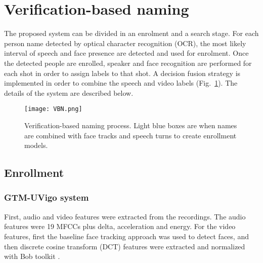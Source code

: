 \section{Verification-based naming}
\label{sec:verification}


The proposed system can be divided in an enrolment and a search stage. For each person name detected by optical character recognition (OCR), the most likely interval
of speech and face presence are detected and used for enrolment.
Once the detected people are enrolled, speaker and face recognition
are performed for each shot in order to assign labels to that shot. 
A decision fusion strategy is implemented in order to combine the speech and video labels (Fig.~\ref{fig:vbn}). The details of the system
are described below.

\begin{figure}[!htb]
 \centering
 \texttt{[image: VBN.png]}
\vspace*{-5mm}
 \caption{Verification-based naming process. Light blue boxes are when names are combined with face tracks and speech turns to create enrollment models.}
\vspace*{-5mm}
 \label{fig:vbn}
\end{figure}

\subsection{Enrollment}

\subsubsection{GTM-UVigo system}
First, audio and video features were extracted from the recordings. The audio features were 19 MFCCs plus delta, acceleration and energy. For the video features, first
the baseline face tracking approach was used to detect faces, and then discrete cosine transform (DCT) features were extracted and normalized with Bob toolkit \cite{bob2012}.

